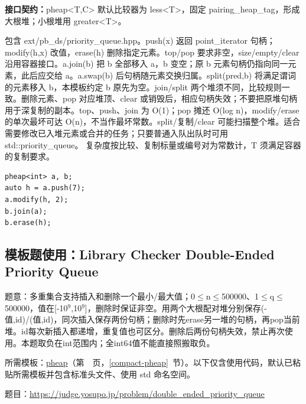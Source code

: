 {\sloppy{}\noindent\textbf{接口契约：}pheap<T,C> 默认比较器为 less<T>，固定 pairing\_heap\_tag，形成大根堆；小根堆用 greater<T>。

包含 ext/pb\_ds/priority\_queue.hpp。push(x) 返回 point\_iterator 句柄；modify(h,x) 改值，erase(h) 删除指定元素。top/pop 要求非空，size/empty/clear 沿用容器接口。a.join(b) 把 b 全部移入 a，b 变空；原 b 元素句柄仍指向同一元素，此后应交给 a。a.swap(b) 后句柄随元素交换归属。split(pred,b) 将满足谓词的元素移入 b，本模板约定 b 原先为空。join/split 两个堆须不同，比较规则一致。删除元素、pop 对应堆顶、clear 或销毁后，相应句柄失效；不要把原堆句柄用于深复制的副本。top、push、join 为 O(1)；pop 摊还 O(log n)，modify/erase 的单次最坏可达 O(n)，不当作最坏常数。split/复制/clear 可能扫描整个堆。适合需要修改已入堆元素或合并的任务；只要普通入队出队时可用 std::priority\_queue。 复杂度按比较、复制标量或编号对为常数计，T 须满足容器的复制要求。\par}



\begin{lstlisting}
pheap<int> a, b;
auto h = a.push(7);
a.modify(h, 2);
b.join(a);
b.erase(h);
\end{lstlisting}

\Needspace{654pt}

\subsection*{模板题使用：Library Checker Double-Ended Priority Queue}

\label{usage-example-189}

题意：多重集合支持插入和删除一个最小/最大值；0$\le$n$\le$500000、1$\le$q$\le$500000，值在[-10$^{9}$,10$^{9}$]，删除时保证非空。用两个大根配对堆分别保存(-值,id)/(值,id)，同次插入保存两份句柄；删除时先erase另一堆的句柄，再pop当前堆。id每次新插入都递增，重复值也可区分。删除后两份句柄失效，禁止再次使用。本题取负在int范围内；全int64值不能直接照搬取负。

所需模板：\hyperref[compact-pheap]{pheap}（第~\pageref{compact-pheap}~页，\ref{compact-pheap}~节）。以下仅含使用代码，默认已粘贴所需模板并包含标准头文件、使用 std 命名空间。

题目：\url{https://judge.yosupo.jp/problem/double_ended_priority_queue}



\newpage

\Needspace{641pt}

